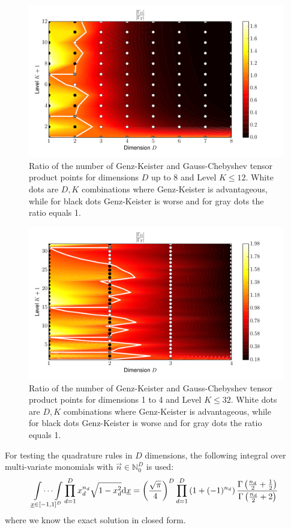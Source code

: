 \documentclass[a4paper,10pt]{article}
\begin{document}
\begin{figure}[h]
  \centering
  \includegraphics[width=0.8\linewidth]{./img/gk_chebyshevu_ratio.pdf}
  \caption{Ratio of the number of Genz-Keister and Gauss-Chebyshev tensor product
  points for dimensions $D$ up to 8 and Level $K \leq 12$. White dots are $D,K$
  combinations where Genz-Keister is advantageous, while for black dots
  Genz-Keister is worse and for gray dots the ratio equals 1.}
  \label{fig:gk_chebyshevu_ratio}
\end{figure}

\begin{figure}[h]
  \centering
  \includegraphics[width=0.8\linewidth]{./img/gk_chebyshevu_ratio_large.pdf}
  \caption{Ratio of the number of Genz-Keister and Gauss-Chebyshev tensor product
  points for dimensions 1 to 4 and Level $K \leq 32$. White dots are $D,K$
  combinations where Genz-Keister is advantageous, while for black dots
  Genz-Keister is worse and for gray dots the ratio equals 1.}
  \label{fig:gk_chebyshevu_ratio_large}
\end{figure}

For testing the quadrature rules in $D$ dimensions, the following integral
over multi-variate monomials with $\vec{n} \in \mathbb{N}_0^D$ is used:
\begin{equation} \label{eq:chebyshevu_exact_solution}
  \idotsint \limits_{\underline{x} \in [-1,1]^D} \prod_{d=1}^D x_d^{n_d} \sqrt{1-x_d^2} \mathrm{d}\underline{x}
  =
  \left(\frac{\sqrt{\pi}}{4}\right)^D
  \prod_{d=1}^D \left(1 + (-1)^{n_d}\right)
  \frac{\Gamma\left(\frac{n_d}{2}+\frac{1}{2}\right)}
       {\Gamma\left(\frac{n_d}{2}+2\right)}
\end{equation}
where we know the exact solution in closed form.
\end{document}
